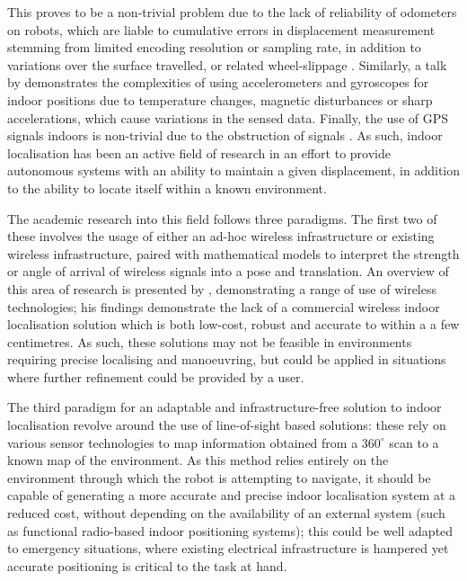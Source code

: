 \documentclass[authoryearcitations]{UoYCSproject}
\begin{document}
This proves to be a non-trivial problem due to the lack of reliability of odometers on robots, which are liable to cumulative errors in displacement measurement stemming from limited encoding resolution or sampling rate, in addition to variations over the surface travelled, or related wheel-slippage \cite{Borenstein1996-al}. Similarly, a talk by \citet{Sachs2010-pw} demonstrates the complexities of using accelerometers and gyroscopes for indoor positions due to temperature changes, magnetic disturbances or sharp accelerations, which cause variations in the sensed data. Finally, the use of GPS signals indoors is non-trivial due to the obstruction of signals \cite{Gowdayyanadoddi2015-hg}. As such, indoor localisation has been an active field of research in an effort to provide autonomous systems with an ability to maintain a given displacement, in addition to the ability to locate itself within a known environment. 
\newline

The academic research into this field follows three paradigms. The first two of these involves the usage of either an ad-hoc wireless infrastructure or existing wireless infrastructure, paired with mathematical models to interpret the strength or angle of arrival of wireless signals into a pose and translation. An overview of this area of research is presented by \citet{Liu2007-in}, demonstrating a range of use of wireless technologies; his findings demonstrate the lack of a commercial wireless indoor localisation solution which is both low-cost, robust and accurate to within a a few centimetres. As such, these solutions may not be feasible in environments requiring precise localising and manoeuvring, but could be applied in situations where further refinement could be provided by a user. 
\newline

The third paradigm for an adaptable and infrastructure-free solution to indoor localisation revolve around the use of line-of-sight based solutions: these rely on various sensor technologies to map information obtained from a  $360^{\circ}$ scan to a known map of the environment. As this method relies entirely on the environment through which the robot is attempting to navigate, it should be capable of generating a more accurate and precise indoor localisation system at a reduced cost, without depending on the availability of an external system (such as functional radio-based indoor positioning systems); this could be well adapted to emergency situations, where existing electrical infrastructure is hampered yet accurate positioning is critical to the task at hand. 
\newline
\end{document}
